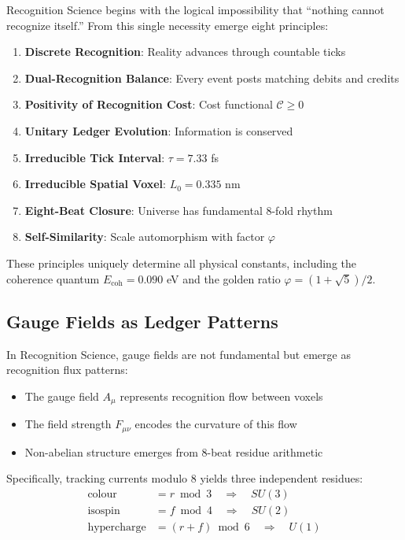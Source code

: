 \documentclass[11pt]{article}
\numberwithin{equation}{section}
\theoremstyle{definition}
\theoremstyle{remark}
\begin{document}
Recognition Science begins with the logical impossibility that ``nothing cannot recognize itself.'' From this single necessity emerge eight principles:
\begin{enumerate}
\item \textbf{Discrete Recognition}: Reality advances through countable ticks
\item \textbf{Dual-Recognition Balance}: Every event posts matching debits and credits  
\item \textbf{Positivity of Recognition Cost}: Cost functional $\mathcal{C} \geq 0$
\item \textbf{Unitary Ledger Evolution}: Information is conserved
\item \textbf{Irreducible Tick Interval}: $\tau = 7.33$ fs
\item \textbf{Irreducible Spatial Voxel}: $L_0 = 0.335$ nm
\item \textbf{Eight-Beat Closure}: Universe has fundamental 8-fold rhythm
\item \textbf{Self-Similarity}: Scale automorphism with factor $\varphi$
\end{enumerate}

These principles uniquely determine all physical constants, including the coherence quantum $E_{\text{coh}} = 0.090$ eV and the golden ratio $\varphi = (1+\sqrt{5})/2$.

\subsection{Gauge Fields as Ledger Patterns}

In Recognition Science, gauge fields are not fundamental but emerge as recognition flux patterns:
\begin{itemize}
\item The gauge field $A_\mu$ represents recognition flow between voxels
\item The field strength $F_{\mu\nu}$ encodes the curvature of this flow  
\item Non-abelian structure emerges from 8-beat residue arithmetic
\end{itemize}

Specifically, tracking currents modulo 8 yields three independent residues:
\begin{align}
\text{colour} &= r \bmod 3 \quad \Rightarrow \quad SU(3)\\
\text{isospin} &= f \bmod 4 \quad \Rightarrow \quad SU(2)\\  
\text{hypercharge} &= (r+f) \bmod 6 \quad \Rightarrow \quad U(1)
\end{align}
\end{document}

